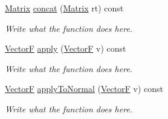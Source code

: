 \begin{DoxyCompactItemize}
\hyperlink{classMatrix}{Matrix} \hyperlink{classMatrix_ab915ae9d317df03b6731438f9add20d8}{concat} (\hyperlink{classMatrix}{Matrix} rt) const 
\begin{DoxyCompactList}\small\item\em Write what the function does here. \end{DoxyCompactList}\item 
\hyperlink{structVectorF}{Vector\+F} \hyperlink{classMatrix_ab7d05d1560328ca22ab4809299b6d128}{apply} (\hyperlink{structVectorF}{Vector\+F} v) const 
\begin{DoxyCompactList}\small\item\em Write what the function does here. \end{DoxyCompactList}\item 
\hyperlink{structVectorF}{Vector\+F} \hyperlink{classMatrix_a4c6d99e79768c1e3e01f1cf8ce143951}{apply\+To\+Normal} (\hyperlink{structVectorF}{Vector\+F} v) const 
\begin{DoxyCompactList}\small\item\em Write what the function does here. \end{DoxyCompactList}\end{DoxyCompactItemize}
